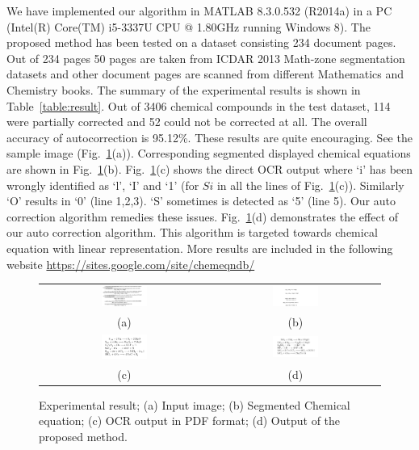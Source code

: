 \documentclass[oneside,a4paper,12pt]{book}
\begin{document}
We have implemented our algorithm in MATLAB 8.3.0.532
(R2014a) in a PC (Intel(R) Core(TM) i5-3337U CPU @ 1.80GHz
running Windows 8). The proposed method has been tested on
a dataset consisting 234 document pages. Out of 234 pages 50
pages are taken from ICDAR 2013 Math-zone segmentation
datasets and other document pages are scanned from different Mathematics and
Chemistry books. 
The summary of the experimental results
is shown in Table~\ref{table:result}. Out of 3406 chemical compounds in the test dataset, 114 were partially corrected and 52 could not be corrected at all. The overall accuracy of autocorrection is 95.12\%. These results are quite encouraging. See the sample image (Fig.~\ref{eg}(a)). Corresponding segmented displayed chemical equations are shown in Fig.~\ref{eg}(b). Fig.~\ref{eg}(c) shows the direct OCR output where `i' has been wrongly identified as `l', `I' and `1' (for $Si$ in all the lines of  Fig.~\ref{eg}(c)). Similarly `O' results in `0' (line 1,2,3). `S' sometimes is detected as `5' (line 5). Our auto correction algorithm remedies these issues. Fig.~\ref{eg}(d) demonstrates the effect of our auto correction algorithm. This algorithm is targeted towards chemical equation with linear representation. More results are included in the following website \url{https://sites.google.com/site/chemeqndb/}

\begin{figure}[!htb]
\center\footnotesize
\begin{tabular}{ |c|c|}
\hline
 \includegraphics[width=0.28\textwidth]{sampleDocument.png} &
 \includegraphics[width=0.28\textwidth]{DCE.png} \\
(a)  & (b) \\ 
\hline
 \includegraphics[width=0.28\textwidth]{directOCR.jpg} &
\includegraphics[width=0.28\textwidth]{correctedFinalEq.jpg}\\
 
 (c)  & (d)  \\
 \hline
\end{tabular}
\caption{Experimental result; (a) Input image; (b) Segmented Chemical equation;
(c) OCR output in PDF format; (d) Output of the proposed method.}
\label{eg} 
\end{figure}
\end{document}

